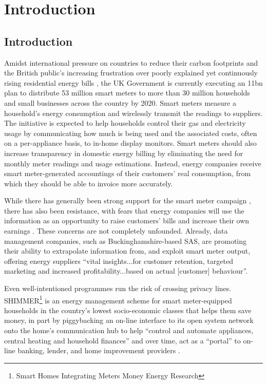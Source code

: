 \chapter{Introduction}
\section{Introduction}
Amidst international pressure on countries to reduce their carbon footprints \cite{E_spending,DECC_1} and the British public's increasing frustration over poorly explained yet continuously rising residential energy bills \cite{E_spending}, the UK Government is currently executing an \textsterling 11bn plan to distribute 53 million smart meters to more than 30 million households and small businesses across the country by 2020\cite{Liao}. Smart meters measure a household's energy consumption and wirelessly transmit the readings to suppliers.  The initiative is expected to help households control their gas and electricity usage by communicating how much is being used and the associated costs, often on a per-appliance basis, to in-home display monitors. Smart meters should also increase transparency in domestic energy billing by eliminating the need for monthly meter readings and usage estimations. Instead, energy companies receive smart meter-generated accountings of their customers' real consumption, from which they should be able to invoice more accurately.  

While there has generally been strong support for the smart meter campaign \cite{DECC_1}, there has also been resistance, with fears that energy companies will use the information as an opportunity to raise customers' bills and increase their own earnings \cite{stop,Anderson}. These concerns are not completely unfounded. Already, data management companies, such as Buckinghamshire-based SAS, are promoting their ability to extrapolate information from, and exploit smart meter output, offering energy suppliers ``vital insights...for customer retention, targeted marketing and increased profitability...based on actual [customer] behaviour''\cite{SAS}. 

Even well-intentioned programmes run the risk of crossing privacy lines. SHIMMER\footnote{Smart Homes Integrating Meters Money Energy Research} is an energy management scheme for smart meter-equipped households in the country's lowest socio-economic classes that helps them save money, in part by piggybacking an on-line interface to its open system network onto the home's communication hub to help ``control and automate appliances, central heating and household finances'' and over time, act as a ``portal'' to on-line banking, lender, and home improvement providers \cite{SHIMMER}. 

